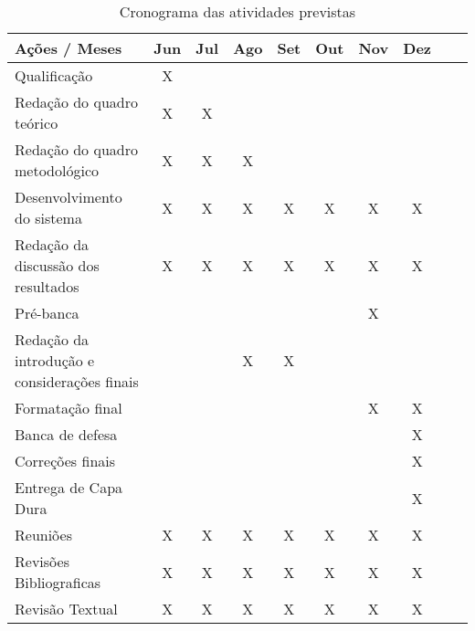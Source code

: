 \begin{table}[!htpb]
\centering

\begin{small} 
  
\setlength{\tabcolsep}{8pt} 


\begin{tabular}{|l|c|c|c|c|c|c|c|c|c|}\hline

\textbf{Ações / Meses} & Jun & Jul & Ago & Set & Out & Nov & Dez
\\
\hline

Qualificação & X &  &  &  &  &  &  \\ \hline

Redação do quadro teórico & X & X &  &  &  &  &  \\ \hline

Redação do quadro metodológico & X & X & X &  &  &  &  \\ \hline

Desenvolvimento do sistema & X & X & X & X & X & X & X \\ \hline

Redação da discussão dos resultados & X & X & X & X & X & X & X \\ \hline

Pré-banca &  &  &  &  &  & X &  \\ \hline

Redação da introdução e considerações finais &  &  & X & X &  &  & \\\hline

Formatação final &  &  &  &  &  & X & X \\ \hline

Banca de defesa &  &  &  &  &  &  & X \\ \hline

Correções finais &  &  &  &  &  &  & X \\ \hline

Entrega de Capa Dura &  &  &  &  &  &  & X \\ \hline

Reuniões & X & X & X & X & X & X & X \\ \hline

Revisões Bibliograficas & X & X & X & X & X & X & X \\ \hline

Revisão Textual & X & X & X & X & X & X & X \\ \hline


\end{tabular} 
\end{small}
\caption{Cronograma das atividades previstas}
\label{t_cronograma}
\end{table} 


